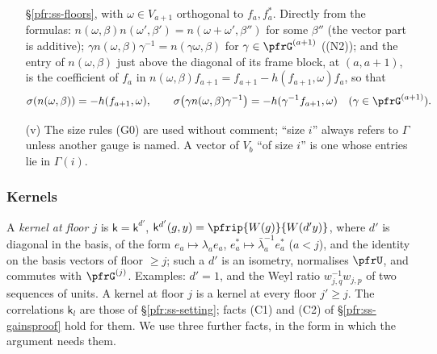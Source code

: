 \documentclass[10pt]{amsart}
\theoremstyle{definition}
\theoremstyle{remark}
\begin{document}
\begin{enumerate}
\S\ref{pfr:ss-floors}, with $\omega\in V_{a+1}$ orthogonal to $f_a,f_a^*$. Directly from the formulas:
$n(\omega,\beta)n(\omega',\beta')=n(\omega+\omega',\beta'')$ for some $\beta''$ (the vector part is additive);
$\gamma n(\omega,\beta)\gamma^{-1}=n(\gamma\omega,\beta)$ for $\gamma\in\pfrG^{(a+1)}$ ((N2)); and the entry of
$n(\omega,\beta)$ just above the diagonal of its frame block, at $(a,a+1)$, is the coefficient of $f_a$ in
$n(\omega,\beta)f_{a+1}=f_{a+1}-h(f_{a+1},\omega)f_a$, so that
\begin{equation}\label{pfs:eq-sigma}
\sigma(n(\omega,\beta))=-h(f_{a+1},\omega),\qquad
\sigma\bigl(\gamma n(\omega,\beta)\gamma^{-1}\bigr)=-h(\gamma^{-1}f_{a+1},\omega)\quad(\gamma\in\pfrG^{(a+1)}).
\end{equation}
\item[(v)] The size rules (G0) are used without comment; ``size $i$'' always refers to $\Gamma$ unless
another gauge is named. A vector of $V_b$ ``of size $i$'' is one whose entries lie in $\Gamma(i)$.
\end{enumerate}

\subsubsection*{Kernels}
A \emph{kernel at floor $j$} is $\mathsf k=\mathsf k^{d'}$, $\mathsf k^{d'}(g,y)=\pfrip{W(g)}{W(d'y)}$, where
$d'$ is diagonal in the basis, of the form $e_a\mapsto\lambda_ae_a$, $e_a^*\mapsto\bar\lambda_a^{-1}e_a^*$ ($a<j$),
and the identity on the basis vectors of floor $\ge j$; such a $d'$ is an isometry, normalises $\pfrU$, and
commutes with $\pfrG^{(j)}$. Examples: $d'=1$, and the Weyl ratio $w_{j,q}^{-1}w_{j,p}$ of two sequences of units.
A kernel at floor $j$ is a kernel at every floor $j'\ge j$. The correlations $\mathsf k_l$ are those of \S\ref{pfr:ss-setting};
facts (C1) and (C2) of \S\ref{pfr:ss-gainsproof} hold for them. We use three further facts, in the form in
which the argument needs them.
\end{document}
